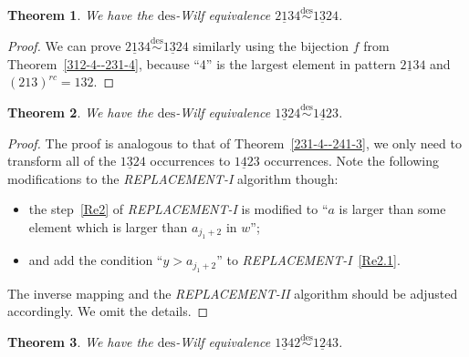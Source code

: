 \documentclass[11pt,reqno]{amsart}
\numberwithin{equation}{section}
\theoremstyle{plain}
\newtheorem{theorem}{Theorem}[section]
\theoremstyle{definition}
\def\des{\mathrm{des}}
\begin{document}
\begin{theorem} \label{213-4--132-4}
  We have the $\des$-Wilf equivalence $\underline{213}4\overset{\des}{\sim }\underline{132}4$.
\end{theorem}

\begin{proof}
  We can prove $\underline{213}4\overset{\des}{\sim }\underline{132}4$ similarly using 
  the bijection $f$ from Theorem~\ref{312-4--231-4}, because ``4'' is the largest element in pattern
  $\underline{213}4$ and $(213)^{rc}=132$.
\end{proof}

\begin{theorem}
  We have the $\des$-Wilf equivalence $\underline{132}4\overset{\des}{\sim }\underline{142}3$. \label{132-4--142-3}
\end{theorem}

\begin{proof}
  The proof is analogous to that of Theorem~\ref{231-4--241-3}, we only need to transform all of the $\underline{132}4$ occurrences to $\underline{142}3$ occurrences. Note the following modifications to the \textit{REPLACEMENT-I} algorithm though:
  \begin{itemize}
      \item  the step~\ref{Re2} of \textit{REPLACEMENT-I} is modified to ``$a$ is larger than some element which is larger than $a_{j_1+2}$ in $w$'';
      \item  and add the condition ``$y>a_{j_1+2}$'' to \textit{REPLACEMENT-I}~\ref{Re2.1}. 
  \end{itemize}
  The inverse mapping and the \textit{REPLACEMENT-II} algorithm should be adjusted accordingly. We omit the details.
\end{proof}

\begin{theorem}
  We have the $\des$-Wilf equivalence $\underline{134}2 \overset{\des}{\sim } \underline{124}3$.  \label{134-2--124-3}   
\end{theorem}
\end{document}
